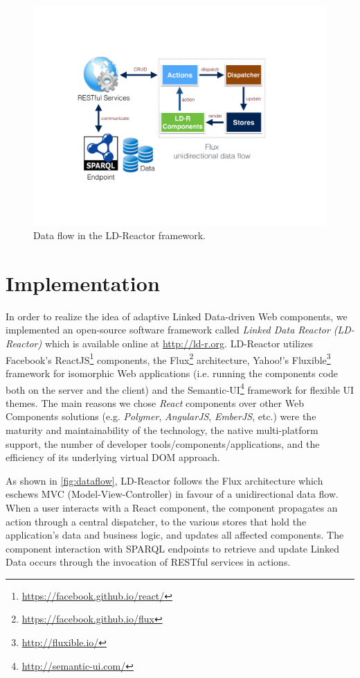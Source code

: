 \documentclass{llncs}
\begin{document}
\begin{figure}[tb]
\center
  \includegraphics[width=.65\linewidth]{images/dataflow.pdf}
  \caption{Data flow in the LD-Reactor framework.}
  \label{fig:dataflow}
\end{figure}

\section{Implementation}
\label{sec:implementation}
In order to realize the idea of adaptive Linked Data-driven Web components, we implemented an open-source software framework called \emph{Linked Data Reactor (LD-Reactor)} which is available online at \url{http://ld-r.org}.
LD-Reactor utilizes Facebook's ReactJS\footnote{\url{https://facebook.github.io/react/}} components, the Flux\footnote{\url{https://facebook.github.io/flux}} architecture, Yahoo!'s Fluxible\footnote{\url{http://fluxible.io/}} framework for isomorphic Web applications (i.e. running the components code both on the server and the client) and the Semantic-UI\footnote{\url{http://semantic-ui.com/}} framework for flexible UI themes.
The main reasons we chose \emph{React} components over other  Web Components solutions (e.g. \emph{Polymer}, \emph{AngularJS}, \emph{EmberJS}, etc.) were the maturity and maintainability of the technology, the native multi-platform support, the number of developer tools/components/applications, and the efficiency of its underlying virtual DOM approach.

As shown in \autoref{fig:dataflow}, LD-Reactor follows the Flux architecture which eschews MVC (Model-View-Controller) in favour of a unidirectional data flow.
When a user interacts with a React component, the component propagates an action through a central dispatcher, to the various stores that hold the application's data and business logic, and updates all affected components.
The component interaction with SPARQL endpoints to retrieve and update Linked Data occurs through the invocation of RESTful services in actions.
\end{document}
